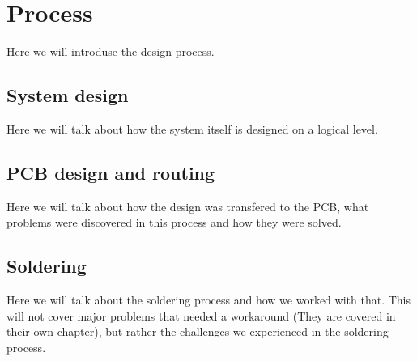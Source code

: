 \section {Process}

Here we will introduse the design process.

\subsection{System design} \label{pcb:process:ss:system_design}

Here we will talk about how the system itself is designed on a logical level.

\subsection{PCB design and routing} \label{pcb:process:ss:pcb_design_and_soldering}

Here we will talk about how the design was transfered to the PCB, what problems were discovered in this process and how they were solved.

\subsection{Soldering} \label{pcb:process:ss:soldering}

Here we will talk about the soldering process and how we worked with that.
This will not cover major problems that needed a workaround (They are covered in their own chapter), but rather the challenges we experienced in the soldering process.

